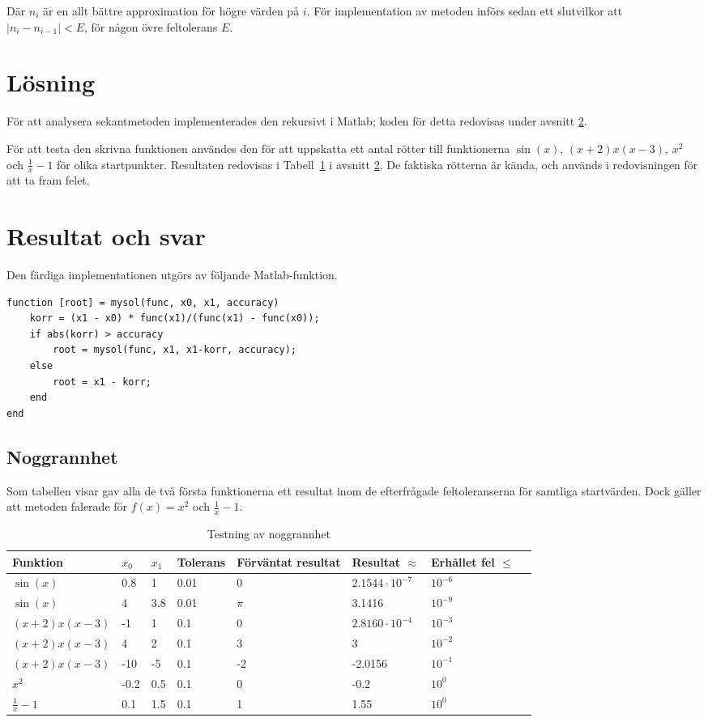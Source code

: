 \documentclass{article}
\begin{document}
Där $n_{i}$ är en allt bättre approximation för högre värden på $i$. För implementation av metoden införs sedan ett slutvilkor att $|n_{i} - n_{i-1}| < E$, för någon övre feltolerans $E$.

\section{Lösning}
För att analysera sekantmetoden implementerades den rekursivt i Matlab; koden för detta redovisas under avsnitt \ref{resultat}. 

För att testa den skrivna funktionen användes den för att uppskatta ett antal rötter till funktionerna $\sin(x)$, $ (x+2) x (x-3)$, $x^2$ och $\frac{1}{x} - 1$ för olika startpunkter. Resultaten redovisas i Tabell~\ref{noggrannhet} i avsnitt \ref{resultat}. De faktiska rötterna är kända, och används i redovisningen för att ta fram felet. 

\section{Resultat och svar} \label{resultat}
Den färdiga implementationen utgörs av följande Matlab-funktion.
\begin{lstlisting}
function [root] = mysol(func, x0, x1, accuracy)
    korr = (x1 - x0) * func(x1)/(func(x1) - func(x0));
    if abs(korr) > accuracy
        root = mysol(func, x1, x1-korr, accuracy);
    else
        root = x1 - korr;
    end
end
\end{lstlisting}

\subsection{Noggrannhet}
Som tabellen visar gav alla de två första funktionerna ett resultat inom de efterfrågade feltoleranserna för samtliga startvärden. Dock gäller att metoden falerade för $f(x) = x^2$ och $\frac{1}{x} - 1$.
\begin{table}[H]
  \begin{tabu}{ l l l l X[0.5cm] X l X }
    Funktion & $x_0$ & $x_1$ & Tolerans & Förväntat resultat & Resultat $\approx$ & Erhållet fel $\leq$ \\
    \toprule
    $\sin(x)$ & 0.8 & 1 & 0.01 & 0 & $2.1544 \cdot 10^{-7}$ & $10^{-6}$ \\
    $\sin(x)$ & 4 & 3.8 & 0.01 & $\pi$ & 3.1416 & $10^{-9} $\\
    $ (x+2) x (x-3)$ & -1 & 1 & 0.1 & 0 & $2.8160 \cdot 10^{-4}$ & $10^{-3}$ \\
    $ (x+2) x (x-3)$ & 4 & 2 & 0.1 & 3 & 3 & $10^{-2}$ \\
    $ (x+2) x (x-3)$ & -10 & -5 & 0.1 & -2 & -2.0156 & $10^{-1}$ \\
    $ x^{2}$ & -0.2 & 0.5 & 0.1 & 0 & -0.2  & $10^{0} $ \\
    $ \frac{1}{x} - 1 $ & 0.1 & 1.5 & 0.1 & 1 & 1.55 & $10^{0}$ \\
  \end{tabu}
  \caption{Testning av noggrannhet}\label{noggrannhet}
\end{table}
\end{document}
